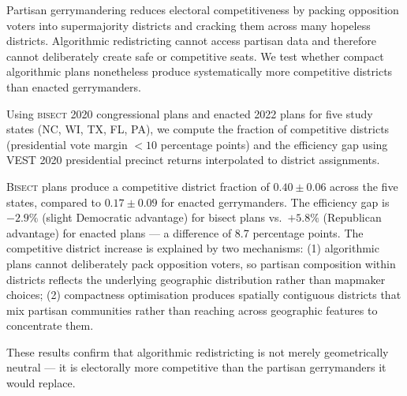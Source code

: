 Partisan gerrymandering reduces electoral competitiveness by packing
opposition voters into supermajority districts and cracking them across
many hopeless districts.
Algorithmic redistricting cannot access partisan data and therefore cannot
deliberately create safe or competitive seats.
We test whether compact algorithmic plans nonetheless produce systematically
more competitive districts than enacted gerrymanders.

Using \textsc{bisect} 2020 congressional plans and enacted 2022 plans for
five study states (NC, WI, TX, FL, PA), we compute the fraction of competitive
districts (presidential vote margin $< 10$ percentage points) and the
efficiency gap using VEST 2020 presidential precinct returns
interpolated to district assignments.

\textsc{Bisect} plans produce a competitive district fraction of
$0.40 \pm 0.06$ across the five states, compared to $0.17 \pm 0.09$
for enacted gerrymanders.
The efficiency gap is $-2.9\%$ (slight Democratic advantage) for bisect plans
vs.\ $+5.8\%$ (Republican advantage) for enacted plans ---
a difference of 8.7 percentage points.
The competitive district increase is explained by two mechanisms:
(1) algorithmic plans cannot deliberately pack opposition voters,
so partisan composition within districts reflects the underlying geographic
distribution rather than mapmaker choices;
(2) compactness optimisation produces spatially contiguous districts that
mix partisan communities rather than reaching across geographic features
to concentrate them.

These results confirm that algorithmic redistricting is not merely
geometrically neutral --- it is electorally more competitive than the
partisan gerrymanders it would replace.
